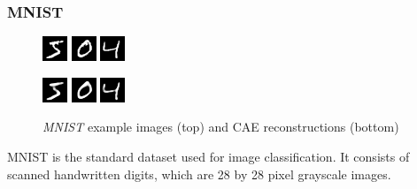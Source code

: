 \documentclass[draft]{article}
\begin{document}
    \subsubsection{MNIST}
        \begin{figure}[h]
          \centering
          \includegraphics[width=0.15\linewidth]{../graphics/reconstructions/mnist/input_00.png}
          \includegraphics[width=0.15\linewidth]{../graphics/reconstructions/mnist/input_01.png}
          \includegraphics[width=0.15\linewidth]{../graphics/reconstructions/mnist/input_02.png}

          \includegraphics[width=0.15\linewidth]{../graphics/reconstructions/mnist/reconstruction_00.png}
          \includegraphics[width=0.15\linewidth]{../graphics/reconstructions/mnist/reconstruction_01.png}
          \includegraphics[width=0.15\linewidth]{../graphics/reconstructions/mnist/reconstruction_02.png}

          \caption{\emph{MNIST} example images (top) and CAE reconstructions (bottom)}
        \end{figure}
        MNIST \citep{lecun1998mnist} is the standard dataset used for image classification. It consists of scanned handwritten digits, which are 28 by 28 pixel grayscale images.
\end{document}
